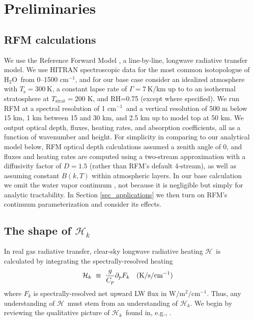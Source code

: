 \documentclass{ametsoc}
\newcommand{\beqn}{\begin{equation}}
\newcommand{\eeqn}{\end{equation}}
\newcommand{\Kelvin}{\ensuremath{\mathrm{K}}}
\newcommand{\km}{\ensuremath{\mathrm{km}}}
\newcommand{\Wmsq}{\ensuremath{\mathrm{W/m^2}}}
\newcommand{\cminverse}{\ensuremath{\mathrm{cm^{-1}}}}
\newcommand{\ppp}{\ensuremath{\partial_p}}
\newcommand{\Cp}{\ensuremath{C_p}}
\newcommand{\Ts}{\ensuremath{T_\mathrm{s}}}
\newcommand{\htwo}{\ensuremath{\mathrm{H_2O}}}
\newcommand{\RH}{\ensuremath{\mathrm{RH}}}
\newcommand{\ch}{\ensuremath{\mathcal{H}}}
\newcommand{\chk}{\ensuremath{\ch_k}}
\newcommand{\Tstrat}{\ensuremath{T_{\mathrm{strat}}}}
\begin{document}
\section{Preliminaries}\label{sec_preliminaries}
\subsection{RFM calculations} \label{sec_rfm_calcs}
We use the Reference Forward Model \citep[RFM,][]{dudhia2017}, a line-by-line, longwave radiative transfer model. We use HITRAN spectroscopic data for the most common isotopologue of \htwo\ from 0--1500 \cminverse, and for our base case consider an idealized atmosphere with $\Ts=300\ \Kelvin$,  a constant lapse rate of $\Gamma= 7\ \Kelvin/\km$ up to to an isothermal stratosphere at $\Tstrat=200$ K, and \RH=0.75 (except where specified). We run RFM at a spectral resolution of 1 \cminverse\ and a vertical resolution of 500 m below 15 km, 1 km between 15 and 30 km, and 2.5 km up to model top at 50 km. We output optical depth, fluxes, heating rates, and absorption coefficients, all as a function of wavenumber and height. For simplicity in comparing to our analytical model below, RFM optical depth calculations assumed a zenith angle of 0, and fluxes and heating rates are computed using a two-stream approximation with a diffusivity factor of $D=1.5$ (rather than RFM's default 4-stream), as well as assuming constant $B(k,T)$ within atmospheric layers.  In our base calculation we omit the water vapor continuum \citep{shine2012}, not because it is negligible but simply for analytic tractability. In Section \ref{sec_applications} we then turn on RFM's continuum parameterization \citep[MT\_CKD,][]{mlawer2012} and  consider its effects.

\subsection{The shape of \chk}
In real gas radiative transfer, clear-sky longwave radiative heating \ch\ is calculated by  integrating the spectrally-resolved heating 
\beqn
	\ch_k \ \equiv \ \frac{g}{\Cp} \ppp F_k \quad \text{(K/s/\cminverse)}
	\label{heat_k}
\eeqn
where $F_k$ is spectrally-resolved net upward LW flux in $\Wmsq/\cminverse$. Thus,  any understanding of \ch\ must stem from an understanding of \chk. We begin by reviewing the qualitative picture of \chk\  found in, e.g., \cite{clough1992}.
\end{document}

